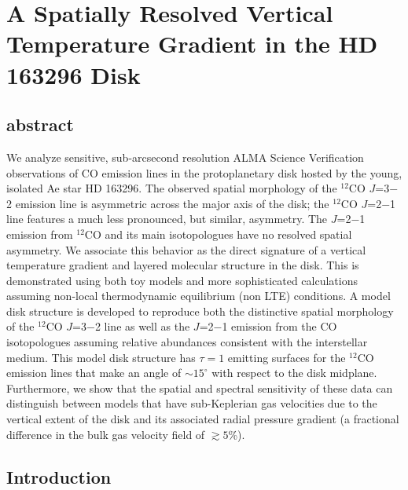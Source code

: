 
\chapter{A Spatially Resolved Vertical Temperature Gradient in the HD 163296 Disk}\label{c:hd163296}

\section*{abstract}
We analyze sensitive, sub-arcsecond resolution ALMA Science Verification 
observations of CO emission lines in the protoplanetary disk hosted by the 
young, isolated Ae star HD 163296.  The observed spatial morphology of the 
$^{12}$CO $J$=3$-$2 emission line is asymmetric across the major axis of the 
disk; the $^{12}$CO $J$=2$-$1 line features a much less pronounced, but similar,
asymmetry.  The $J$=2$-$1 emission from $^{12}$CO and its main isotopologues 
have no resolved spatial asymmetry.  We associate this behavior as the direct 
signature of a vertical temperature gradient and layered molecular structure in 
the disk.  This is demonstrated using both toy models and more sophisticated 
calculations assuming non-local thermodynamic equilibrium (non LTE) conditions. 
A model disk structure is developed to reproduce both the distinctive spatial 
morphology of the $^{12}$CO $J$=3$-$2 line as well as the $J$=2$-$1 emission 
from the CO isotopologues assuming relative abundances consistent with the 
interstellar medium.  This model disk structure has $\tau=1$ emitting surfaces 
for the $^{12}$CO emission lines that make an angle of $\sim 15^\circ$ with 
respect to the disk midplane.  Furthermore, we show that the spatial and 
spectral 
sensitivity of these data can distinguish between models that have 
sub-Keplerian gas velocities due to the vertical extent of the disk and its 
associated radial pressure gradient (a fractional difference in the bulk gas 
velocity field of $\gtrsim 5$\%).


\section{Introduction}

